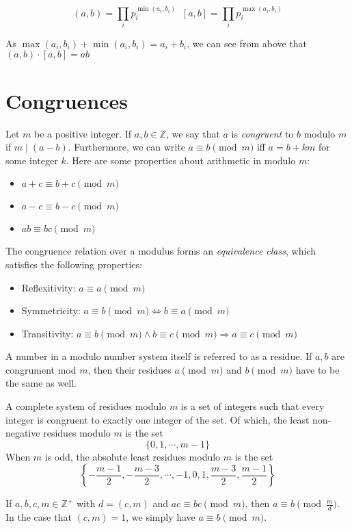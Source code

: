\documentclass{article}
\begin{document}
\begin{multicols*}{2}
\[(a,b) = \prod_{i}p_i^{\min(a_i,b_i)}\;\;[a,b] = \prod_{i}p_i^{\max(a_i, b_i)}\]

As $\max(a_i, b_i) + \min(a_i, b_i) = a_i + b_i$, we can see from above that $(a,b) \cdot [a,b] = ab$

\section{Congruences}

Let $m$ be a positive integer. If $a,b \in \mathbb{Z}$, we say that $a$ is \textit{congruent} to $b$ modulo $m$ if $m \mid (a - b)$. Furthermore, we can write $a \equiv b \pmod{m}$ iff $a = b + km$ for some integer $k$. Here are some properties about arithmetic in modulo $m$:

\begin{itemize}
\item $a+c \equiv b + c \pmod{m}$
\item $a - c \equiv b - c \pmod{m}$
\item $ab \equiv bc \pmod{m}$
\end{itemize}

The congruence relation over a modulus forms an \textit{equivalence class}, which satisfies the following properties:

\begin{itemize}
\item Reflexitivity: $a \equiv a \pmod{m}$
\item Symmetricity: $a \equiv b \pmod{m} \Leftrightarrow b \equiv a \pmod{m}$
\item Transitivity: $a \equiv b \pmod{m} \wedge b \equiv c \pmod{m} \Rightarrow a \equiv c \pmod{m}$
\end{itemize}

A number in a modulo number system itself is referred to as a residue. If $a, b$ are congrument mod $m$, then their residues $a\pmod{m}$ and $b\pmod{m}$ have to be the same as well.

A complete system of residues modulo $m$ is a set of integers such that every integer is congruent to exactly one integer of the set. Of which, the least non-negative residues modulo $m$ is the set \[\{0,1,\cdots,m -1\}\] When $m$ is odd, the absolute least residues modulo $m$ is the set \[\left\{-\frac{m-1}{2}, -\frac{m-3}{2}, \cdots, -1, 0, 1, \frac{m-3}{2}, \frac{m-1}{2}\right\}\]

If $a,b,c,m \in \mathbb{Z}^+$ with $d = (c, m)$ and $ac \equiv bc \pmod{m}$, then $a \equiv b \pmod{\frac{m}{d}}$. In the case that $(c, m) = 1$, we simply have $a \equiv b \pmod{m}$.


\end{multicols*}
\end{document}
